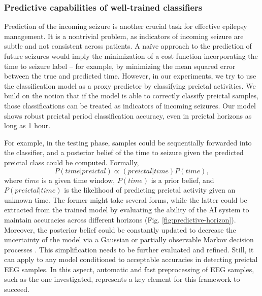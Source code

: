 \documentclass[a4paper,fleqn]{cas-sc}
\begin{document}
\subsubsection*{Predictive capabilities of well-trained classifiers}
Prediction of the incoming seizure is another crucial task for effective epilepsy management. It is a nontrivial problem, as indicators of incoming seizure are subtle and not consistent across patients.  
A naïve approach to the prediction of future seizures would imply the minimization of a cost function incorporating the time to seizure label – for example, by minimizing the mean squared error between the true and predicted time. However, in our experiments, we try to use the classification model as a proxy predictor by classifying preictal activities. We build on the notion that if the model is able to correctly classify preictal samples, those classifications can be treated as indicators of incoming seizures. Our model shows robust preictal period classification accuracy, even in preictal horizons as long as 1 hour.

For example, in the testing phase, samples could be sequentially forwarded into the classifier, and a posterior belief of the time to seizure given the predicted preictal class could be computed. Formally,
\begin{equation*}
    P(time|preictal) \propto (preictal|time)P(time), 
\end{equation*}
where $time$ is a given time window, $P(time)$ is a prior belief, and $P(preictal|time)$ is the likelihood of predicting preictal activity given an unknown time. The former might take several forms, while the latter could be extracted from the trained model by evaluating the ability of the AI system to maintain accuracies across different horizons (Fig. \ref{fig:predictive-horizon}). Moreover, the posterior belief could be constantly updated to decrease the uncertainty of the model via a Gaussian or partially observable Markov decision processes \cite{kaelbling1998planning}. This simplification needs to be further evaluated and refined. Still, it can apply to any model conditioned to acceptable accuracies in detecting preictal EEG samples. In this aspect, automatic and fast preprocessing of EEG samples, such as the one investigated, represents a key element for this framework to succeed.
\end{document}

